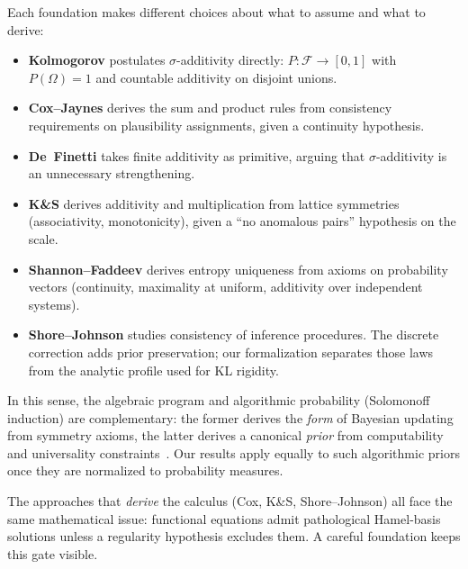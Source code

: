 \documentclass[11pt]{article}
\theoremstyle{definition}
\theoremstyle{remark}
\begin{document}
Each foundation makes different choices about what to assume and what to derive:

\begin{itemize}
\item \textbf{Kolmogorov} postulates $\sigma$-additivity directly: $P:\mathcal{F}\to[0,1]$
  with $P(\Omega)=1$ and countable additivity on disjoint unions. \cite{Kolmogorov1933}

\item \textbf{Cox--Jaynes} derives the sum and product rules from consistency requirements on
  plausibility assignments, given a continuity hypothesis. \cite{Cox1946}

\item \textbf{De~Finetti} takes finite additivity as primitive, arguing that $\sigma$-additivity
  is an unnecessary strengthening. \cite{deFinetti1974}

\item \textbf{K\&S} derives additivity and multiplication from lattice symmetries (associativity,
  monotonicity), given a ``no anomalous pairs'' hypothesis on the scale.

\item \textbf{Shannon--Faddeev} derives entropy uniqueness from axioms on probability vectors
  (continuity, maximality at uniform, additivity over independent systems).
  \cite{Shannon1948,Faddeev1956}

\item \textbf{Shore--Johnson} studies consistency of inference procedures.
  The discrete correction adds prior preservation; our formalization separates
  those laws from the analytic profile used for KL rigidity. \cite{ShoreJohnson1980,JohnsonShore1983}
\end{itemize}

In this sense, the algebraic program and algorithmic probability (Solomonoff induction) are complementary:
the former derives the \emph{form} of Bayesian updating from symmetry axioms, the latter derives a
canonical \emph{prior} from computability and universality constraints~\cite{Solomonoff1964,Hutter2005}.
Our results apply equally to such algorithmic priors once they are normalized to probability measures.

The approaches that \emph{derive} the calculus (Cox, K\&S, Shore--Johnson) all face the same
mathematical issue: functional equations admit pathological Hamel-basis solutions unless a
regularity hypothesis excludes them.  A careful foundation keeps this gate visible.
\end{document}
